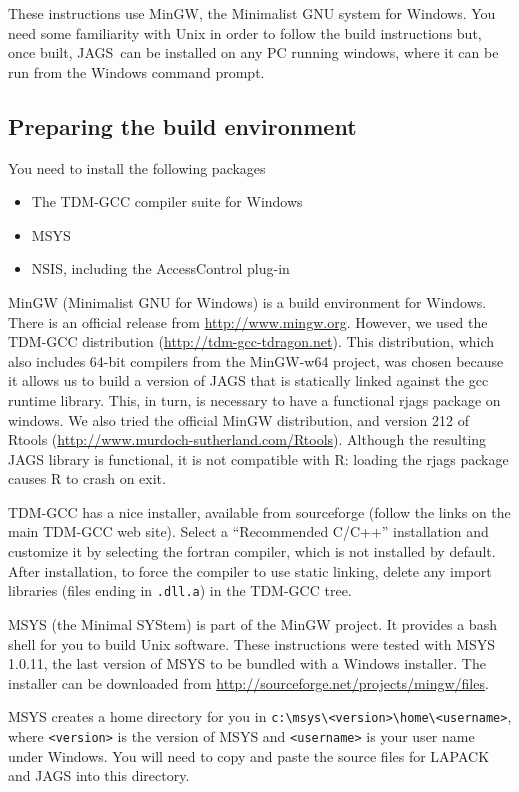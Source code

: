 \documentclass[11pt, a4paper, titlepage]{article}
\newcommand{\JAGS}{\textsf{JAGS}}
\begin{document}
These instructions use MinGW, the Minimalist GNU system for Windows.
You need some familiarity with Unix in order to follow the build
instructions but, once built, \JAGS\ can be installed on any PC
running windows, where it can be run from the Windows command prompt.

\subsection{Preparing the build environment}

You need to install the following packages
\begin{itemize}
\item The TDM-GCC compiler suite for Windows
\item MSYS  
\item NSIS, including the AccessControl plug-in  
\end{itemize}

MinGW (Minimalist GNU for Windows) is a build environment for Windows.
There is an official release from \url{http://www.mingw.org}.  However,
we used the TDM-GCC distribution (\url{http://tdm-gcc-tdragon.net}).
This distribution, which also includes 64-bit compilers from the
MinGW-w64 project, was chosen because it allows us to build a version of
JAGS that is statically linked against the gcc runtime library.  This,
in turn, is necessary to have a functional rjags package on windows.
We also tried the official MinGW distribution, and version 212 of Rtools
(\url{http://www.murdoch-sutherland.com/Rtools}). Although the resulting
JAGS library is functional, it is not compatible with R: loading the
rjags package causes R to crash on exit.

TDM-GCC has a nice installer, available from sourceforge (follow the
links on the main TDM-GCC web site). Select a ``Recommended C/C++''
installation and customize it by selecting the fortran compiler, which
is not installed by default. After installation, to force the compiler
to use static linking, delete any import libraries (files ending in
\verb+.dll.a+) in the TDM-GCC tree.

MSYS (the Minimal SYStem) is part of the MinGW project. It provides a
bash shell for you to build Unix software. These instructions were
tested with MSYS 1.0.11, the last version of MSYS to be bundled with a
Windows installer.  The installer can be downloaded from
\url{http://sourceforge.net/projects/mingw/files}.  

MSYS creates a home directory for you in
\verb+c:\msys\<version>\home\<username>+, where \texttt{<version>} is
the version of MSYS and \texttt{<username>} is your user name under
Windows. You will need to copy and paste the source files for LAPACK
and JAGS into this directory.
\end{document}
